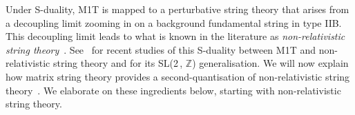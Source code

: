 \documentclass[11pt]{article}
\renewcommand{\emph}[1]{\textit{#1}}
\begin{document}
Under S-duality, M1T is mapped to a perturbative string theory that arises from a decoupling limit zooming in on a background fundamental string in type IIB. This decoupling limit leads to what is known in the literature as \emph{non-relativistic string theory}~\cite{Klebanov:2000pp, Gomis:2000bd, Danielsson:2000gi, Danielsson:2000mu}. See~\cite{Blair:2023noj, Ebert:2021mfu, Ebert:2023hba} for recent studies of this S-duality between M1T and non-relativistic string theory and \cite{Bergshoeff:2022iss,Bergshoeff:2023ogz} for its SL(2\,, $\mathbb{Z}$) generalisation.
We will now explain how matrix string theory provides a second-quantisation of non-relativistic string theory~\cite{Danielsson:2000gi}. We elaborate on these ingredients below, starting with non-relativistic string theory. 

\vspace{3mm}
\end{document}
